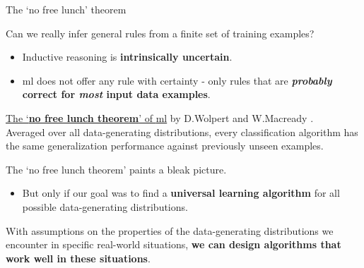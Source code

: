 
\begin{frame}[t]{The `no free lunch' theorem}

Can we really infer general rules from a finite set of training examples?
\begin{itemize}
  \item Inductive reasoning is {\bf intrinsically uncertain}.
  \item \gls{ml} does not offer any rule with certainty - 
  only rules that are {\bf {\em probably} correct for {\em most} input data examples}.
\end{itemize}

\vspace{0.1cm}

\begin{blockexample}{}
\underline{The `{\bf no free lunch theorem}' of  \gls{ml}} 
by D.Wolpert and W.Macready \cite{NoFreeLunch}.\\
{\small
Averaged over all data-generating distributions,
every classification algorithm has the same generalization performance
against previously unseen examples.\\
}
\end{blockexample}

\vspace{0.1cm}

The `no free lunch theorem' paints a bleak picture.
\begin{itemize}
    \item
    But only if our goal was to find a {\bf universal learning algorithm}
   for all possible data-generating distributions.
\end{itemize}

\vspace{0.2cm}

With assumptions on the properties of the data-generating distributions we encounter
in specific real-world situations, {\bf we can design algorithms that work well 
in these situations}.

\end{frame}
